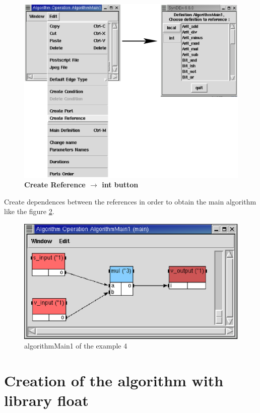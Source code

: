 \documentclass[a4paper,twoside]{report}
\begin{document}
\begin{itemize}
\begin{figure}[htbp]
  \begin{center} 
        \includegraphics[width=0.9\linewidth]{Library_int.eps} 
  \end{center}
  \caption{\textbf{Create Reference $\rightarrow$ int button}}
  \label{library2}
\end{figure}

\end{itemize}

Create dependences between the references in order to obtain the main algorithm
like the figure \ref{algomain1_4}.

\begin{figure}[htbp]
  \begin{center} 
        \includegraphics[width=0.48\linewidth]{algorithm_ex4.eps} 
  \end{center}
  \caption{algorithmMain1 of the example 4}
  \label{algomain1_4}
\end{figure}

\section{Creation of the algorithm with library float}
\end{document}
